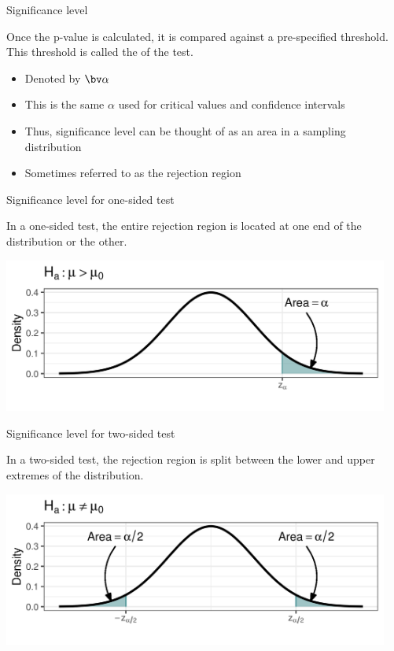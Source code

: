 \documentclass[xcolor=table, aspectratio=169, bigger]{beamer}
\begin{document}
\begin{frame}{Significance level}
\begin{block}{}
Once the p-value is calculated, it is compared against a pre-specified threshold. This threshold is called the  of the test.
\begin{itemize}
\pause\item Denoted by $\bv \alpha$
\pause\item This is the same $\alpha$ used for critical values and confidence intervals
\pause\item Thus, significance level can be thought of as an area in a sampling distribution
\pause\item Sometimes referred to as the rejection region
\end{itemize}
\end{block}
\end{frame}

\begin{frame}{Significance level for one-sided test}
\begin{block}{}
In a one-sided test, the entire rejection region is located at one end of the distribution or the other.
\end{block}

\bigskip

{\centering
\includegraphics[width=5in]{../images/wk08_sig_up}
\par}
\end{frame}

\begin{frame}{Significance level for two-sided test}
\begin{block}{}
In a two-sided test, the rejection region is split between the lower and upper extremes of the distribution.
\end{block}
\bigskip
{\centering
\includegraphics[width=5in]{../images/wk08_sig_2} 
\par}

\end{frame}
\end{document}
